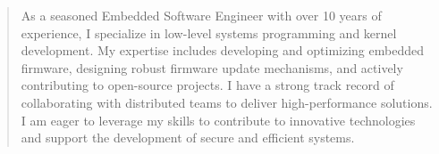 \documentclass[10pt,a4paper]{altacv}
\begin{document}
\begin{paracol}{2}
\divider


\newpage

\switchcolumn

\begin{quote}
{\small As a seasoned Embedded Software Engineer with over 10 years of experience, I specialize in low-level systems programming and kernel development. My expertise includes developing and optimizing embedded firmware, designing robust firmware update mechanisms, and actively contributing to open-source projects. I have a strong track record of collaborating with distributed teams to deliver high-performance solutions. I am eager to leverage my skills to contribute to innovative technologies and support the development of secure and efficient systems.}
\end{quote}








\end{paracol}
\end{document}
